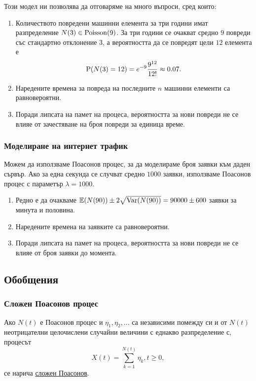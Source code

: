 \documentclass[numbers=endperiod, DIV=15, bibliography=totocnumbered]{scrartcl}
\begin{document}
Този модел ни позволява да отговаряме на много въпроси, сред които:
\begin{enumerate}
  \item Количеството повредени машинни елемента за три години имат разпределение $N(3) \in \operatorname{Poisson}(9)$. За три години се очакват средно $9$ повреди със стандартно отклонение $3$, а вероятността да се повредят цели $12$ елемента е
  \begin{displaymath}
    \operatorname{P}(N(3) = 12) = e^{-9} \frac {9^{12}} {12!} \approx 0.07.
  \end{displaymath}

  \item Наредените времена за повреда на последните $n$ машинни елементи са равновероятни.
  \item Поради липсата на памет на процеса, вероятността за нови повреди не се влияе от зачестяване на броя повреди за единица време.
\end{enumerate}

\subsubsection{Моделиране на интернет трафик}

Можем да използваме Поасонов процес, за да моделираме броя заявки към даден сървър. Ако за една секунда се случват средно $1000$ заявки, използваме Поасонов процес с параметър $\lambda = 1000$.
\begin{enumerate}
  \item Редно е да очакваме $\mathbb{E}(N(90)) \pm 2\sqrt{\operatorname{Var}(N(90))} = 90000 \pm 600$ заявки за минута и половина.
  \item Наредените времена на заявките са равновероятни.
  \item Поради липсата на памет на процеса, вероятността за нови повреди не се влияе от броя заявки до момента.
\end{enumerate}

\subsection{Обобщения}

\subsubsection{Сложен Поасонов процес}

\begin{definition}
  Ако $N(t)$ е Поасонов процес и $\eta_1, \eta_2, \ldots$ са независими помежду си и от $N(t)$ неотрицателни целочислени случайни величини с еднакво разпределение с, процесът
  \begin{displaymath}
    X(t) = \sum_{k=1}^{N(t)} \eta_k, t \geq 0,
  \end{displaymath}
  се нарича \uline{сложен Поасонов}.
\end{definition}
\end{document}
